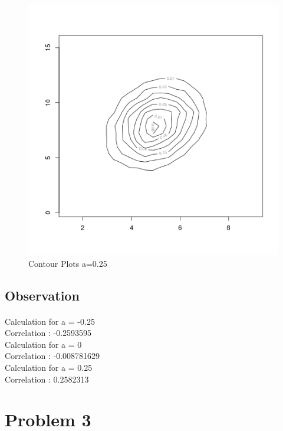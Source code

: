 \documentclass{article}
\begin{document}
  			\begin{figure}[!ht]
  			\includegraphics[width=\linewidth]{pic/contour_plot_3.png}
 			 \caption{Contour Plots a=0.25}
  			\label{fig:hist1_1}
  			\end{figure}
		
		\clearpage
		\subsection{Observation}
		\paragraph{}
		
		Calculation for a =  -0.25 \\
Correlation :  -0.2593595 \\

Calculation for a =  0 \\
Correlation :  -0.008781629 \\

Calculation for a =  0.25 \\
Correlation :  0.2582313 \\

	\pagebreak
			
	    \section{Problem 3}
\end{document}
